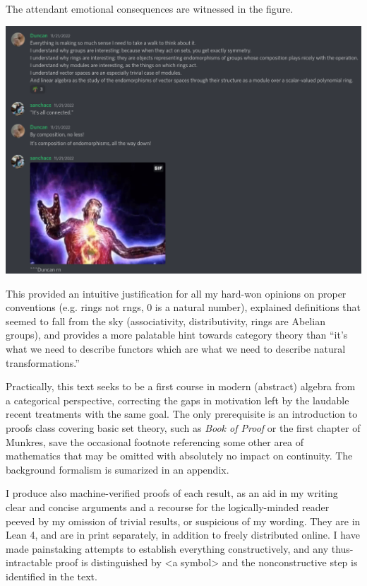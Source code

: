 The attendant emotional consequences are witnessed in the figure.

\begin{center}
  \includegraphics[scale=0.3]{fig/galaxy_brain.png}
\end{center}

This provided an intuitive justification for all my hard-won opinions on proper conventions (e.g. rings not rngs, 0 is a natural number),
explained definitions that seemed to fall from the sky (associativity, distributivity, rings are Abelian groups),
and provides a more palatable hint towards category theory than ``it's what we need to describe functors which are what we need to describe
natural transformations.''

Practically, this text seeks to be a first course in modern (abstract) algebra from a categorical perspective,
correcting the gaps in motivation left by the laudable recent treatments with the same goal. %
The only prerequisite is an introduction to proofs class covering basic set theory, such as \textit{Book of Proof} or the first chapter of Munkres,
save the occasional footnote referencing some other area of mathematics that may be omitted with absolutely no impact on continuity.
The background formalism is sumarized in an appendix.

I produce also machine-verified proofs of each result, as an aid in my writing clear and concise arguments
and a recourse for the logically-minded reader peeved by my omission of trivial results, or suspicious of my wording.
They are in Lean 4, and are in print separately, in addition to freely distributed online.
I have made painstaking attempts to establish everything constructively, and any thus-intractable proof is distinguished by <a symbol> %
and the nonconstructive step is identified in the text.

